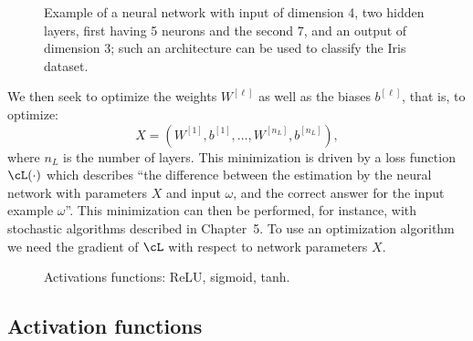 \begin{figure}[h]\centering
\caption{Example of a neural network with input of dimension 4, two hidden layers, first having 5 neurons and the second 7, and an output of dimension 3; such an architecture can be used to classify the Iris dataset\cite{turinici14}.}\label{fig:ch7-mlp}
\end{figure}

We then seek to optimize the weights $W^{[\ell]}$ as well as the biases $b^{[\ell]}$, that is, to optimize:
\begin{equation}\label{eq:ch7-X-params}
  X = (W^{[1]}, b^{[1]}, \ldots, W^{[n_L]}, b^{[n_L]}),
\end{equation}
where $n_L$ is the number of layers. This minimization is driven by a loss function $\cL(\cdot)$ which describes ``the difference between the estimation by the neural network with parameters $X$ and input $\omega$, and the correct answer for the input example $\omega$''. This minimization can then be performed, for instance, with stochastic algorithms described in Chapter~5. To use an optimization algorithm we need the gradient of $\cL$ with respect to network parameters $X$.

\begin{figure}[h]\centering
\caption{Activations functions: ReLU, sigmoid, tanh.}\label{fig:ch7-activations}
\end{figure}

\subsection{Activation functions}

